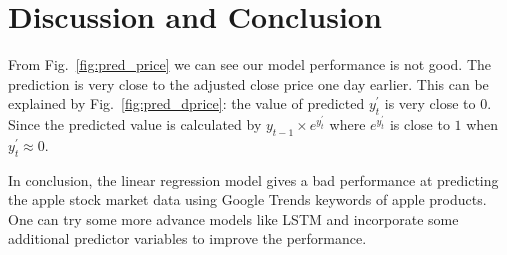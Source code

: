 \documentclass[conference,onecolumn,11pt]{IEEEtran}
\begin{document}
\section{Discussion and Conclusion}

From Fig.~\ref{fig:pred_price} we can see our model performance is not good. The prediction is very close to the adjusted close price one day earlier. This can be explained by Fig.~\ref{fig:pred_dprice}: the value of predicted $y^{'}_t$ is very close to 0. Since the predicted value is calculated by $y_{t-1}\times e^{y^{'}_{t}}$ where $e^{y^{'}_{t}}$ is close to $1$ when $y^{'}_t\approx0$.

In conclusion, the linear regression model gives a bad performance at predicting the apple stock market data using Google Trends keywords of apple products. One can try some more advance models like LSTM and incorporate some additional predictor variables to improve the performance\cite{Aasi2021}.

\printbibliography

\vspace{12pt}
\end{document}
